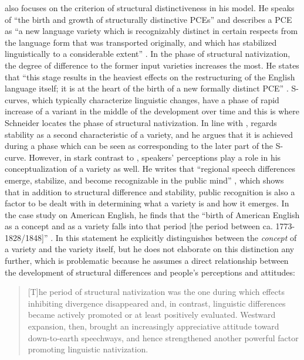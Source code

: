 \citet{Schneider2007} also focuses on the criterion of structural distinctiveness in his model. He speaks of “the birth and growth of structurally distinctive PCEs” \citep[45]{Schneider2007} and describes a PCE as “a new language variety which is recognizably distinct in certain respects from the language form that was transported originally, and which has stabilized linguistically to a considerable extent” \citep[51]{Schneider2007}. In the phase of structural nativization, the degree of difference to the former input varieties increases the most. He states that “this stage results in the heaviest effects on the restructuring of the English language itself; it is at the heart of the birth of a new formally distinct PCE” \citep[44]{Schneider2007}. S-curves, which typically characterize linguistic changes, have a phase of rapid increase of a variant in the middle of the development over time and this is where Schneider locates the phase of structural nativization. In line with \citet{Trudgill2004}, \citet[51]{Schneider2007} regards stability as a second characteristic of a variety, and he argues that it is achieved during a phase which can be seen as corresponding to the later part of the S-curve. However, in stark contrast to \citet{Trudgill2004}, speakers’ perceptions play a role in his conceptualization of a variety as well. He writes that “regional speech differences emerge, stabilize, and become recognizable in the public mind” \citep[9]{Schneider2007}, which shows that in addition to structural difference and stability, public recognition is also a factor to be dealt with in determining what a variety is and how it emerges. In the case study on American English, he finds that the “birth of American English as a concept and as a variety falls into that period [the period between ca. 1773-1828/1848]” \citep[276]{Schneider2007}. In this statement he explicitly distinguishes between the \emph{concept} of a variety and the variety itself, but he does not elaborate on this distinction any further, which is problematic because he assumes a direct relationship between the development of structural differences and people’s perceptions and attitudes:

\begin{quote}
[T]he period of structural nativization was the one during which effects inhibiting divergence disappeared and, in contrast, linguistic differences became actively promoted or at least positively evaluated. Westward expansion, then, brought an increasingly appreciative attitude toward down-to-earth speechways, and hence strengthened another powerful factor promoting linguistic nativization. \citep[278]{Schneider2007}
\end{quote}


